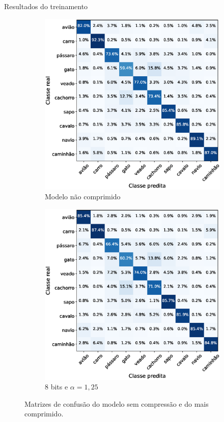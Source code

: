 \begin{frame}{Resultados do treinamento}
    \begin{figure}[H]
        \centering
        \begin{subfigure}[b]{0.49\textwidth}
          \includegraphics[width=\textwidth]{figuras/cifar_no_compress.eps}
          \caption{Modelo não comprimido}
        \end{subfigure}
        \hfill
        \begin{subfigure}[b]{0.49\textwidth}
          \includegraphics[width=\textwidth]{figuras/cifar_q8_p75.eps}
          \caption{8 bits e $\alpha = 1,25$}
        \end{subfigure}
        \caption{Matrizes de confusão do modelo sem compressão e do mais comprimido.}
    \end{figure}
\end{frame}



